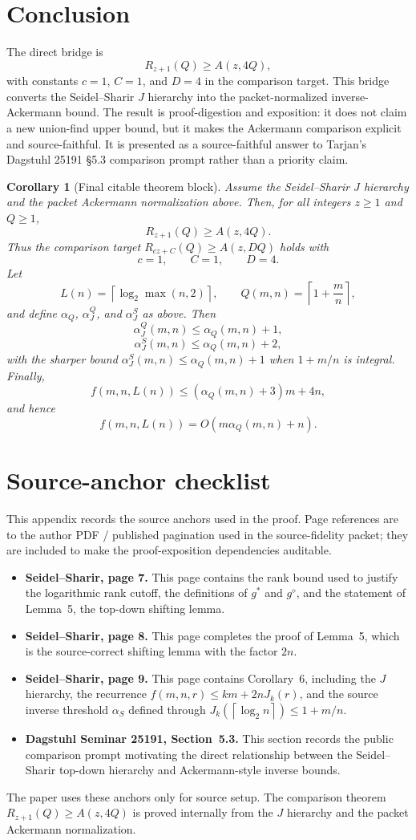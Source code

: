 ﻿\documentclass[11pt]{article}
\newtheorem{corollary}[theorem]{Corollary}
\newcommand{\ceil}[1]{\left\lceil #1 \right\rceil}
\newcommand{\alphaQ}{\alpha_Q}
\newcommand{\alphaJQ}{\alpha_J^Q}
\newcommand{\alphaJS}{\alpha_J^S}
\begin{document}
\section{Conclusion}

The direct bridge is
\[
R_{z+1}(Q)\ge A(z,4Q),
\]
with constants $c=1$, $C=1$, and $D=4$ in the comparison target.  This bridge converts the Seidel--Sharir $J$ hierarchy into the packet-normalized inverse-Ackermann bound.  The result is proof-digestion and exposition: it does not claim a new union-find upper bound, but it makes the Ackermann comparison explicit and source-faithful.  It is presented as a source-faithful answer to Tarjan's Dagstuhl 25191 \S5.3 comparison prompt rather than a priority claim.

\begin{corollary}[Final citable theorem block]\label{cor:final-block}
Assume the Seidel--Sharir $J$ hierarchy and the packet Ackermann normalization above.  Then, for all integers $z\ge1$ and $Q\ge1$,
\[
R_{z+1}(Q)\ge A(z,4Q).
\]
Thus the comparison target $R_{cz+C}(Q)\ge A(z,DQ)$ holds with
\[
c=1,\qquad C=1,\qquad D=4.
\]
Let
\[
L(n)=\ceil{\log_2\max(n,2)},
\qquad
Q(m,n)=\ceil{1+\frac mn},
\]
and define $\alphaQ$, $\alphaJQ$, and $\alphaJS$ as above.  Then
\[
\alphaJQ(m,n)\le\alphaQ(m,n)+1,
\]
\[
\alphaJS(m,n)\le\alphaQ(m,n)+2,
\]
with the sharper bound $\alphaJS(m,n)\le\alphaQ(m,n)+1$ when $1+m/n$ is integral.  Finally,
\[
f(m,n,L(n))\le(\alphaQ(m,n)+3)m+4n,
\]
and hence
\[
f(m,n,L(n))=O(m\alphaQ(m,n)+n).
\]
\end{corollary}


\appendix

\section{Source-anchor checklist}

This appendix records the source anchors used in the proof.  Page references are to the author PDF / published pagination used in the source-fidelity packet; they are included to make the proof-exposition dependencies auditable.

\begin{itemize}[leftmargin=*]
\item \textbf{Seidel--Sharir, page 7.}  This page contains the rank bound used to justify the logarithmic rank cutoff, the definitions of $g^*$ and $g^\diamond$, and the statement of Lemma~5, the top-down shifting lemma.
\item \textbf{Seidel--Sharir, page 8.}  This page completes the proof of Lemma~5, which is the source-correct shifting lemma with the factor $2n$.
\item \textbf{Seidel--Sharir, page 9.}  This page contains Corollary~6, including the $J$ hierarchy, the recurrence $f(m,n,r)\le km+2nJ_k(r)$, and the source inverse threshold $\alpha_S$ defined through $J_k(\ceil{\log_2 n})\le 1+m/n$.
\item \textbf{Dagstuhl Seminar 25191, Section~5.3.}  This section records the public comparison prompt motivating the direct relationship between the Seidel--Sharir top-down hierarchy and Ackermann-style inverse bounds.
\end{itemize}

The paper uses these anchors only for source setup.  The comparison theorem $R_{z+1}(Q)\ge A(z,4Q)$ is proved internally from the $J$ hierarchy and the packet Ackermann normalization.



\end{document}
